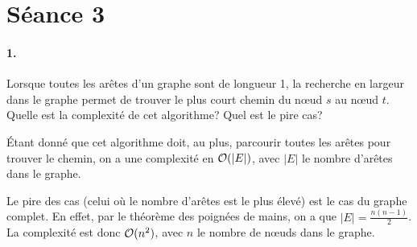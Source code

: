 %
%

\section{Séance 3}


\paragraph{1. } Lorsque toutes les arêtes d'un graphe sont de longueur 1, la recherche en largeur dans le graphe permet de trouver le plus court chemin du nœud $s$ au nœud $t$. Quelle est la complexité de cet algorithme? Quel est le pire cas?

\begin{solution}
  Étant donné que cet algorithme doit, au plus, parcourir toutes les arêtes pour trouver le chemin,
  on a une complexité en $\mathcal{O}(\vert E \vert)$, avec $\vert E \vert$ le nombre d'arêtes dans le graphe.

  Le pire des cas (celui où le nombre d'arêtes est le plus élevé) est le cas du graphe complet.
  En effet, par le théorème des poignées de mains, on a que $\vert E \vert = \frac{n(n-1)}{2}$.
  La complexité est donc $\mathcal{O}(n^2)$, avec $n$ le nombre de nœuds dans le graphe.
\end{solution}

